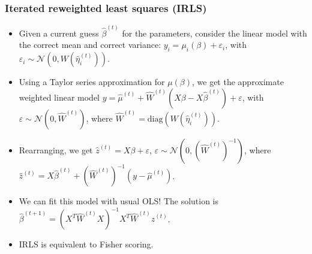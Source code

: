 \documentclass[twoside]{article}
\newcommand\calN{\mathcal{N}}
\def\eps{\varepsilon}
\begin{document}
\subsubsection*{Iterated reweighted least squares (IRLS)}
\begin{itemize}
\item Given a current guess $\hat{\beta}^{(t)}$ for the parameters, consider the linear model with the correct mean and correct variance: $y_i = \mu_i(\beta) + \eps_i$, with $\eps_i \sim \calN(0, W(\hat{\eta}_i^{(t)}))$.

\item Using a Taylor series approximation for $\mu(\beta)$, we get the approximate weighted linear model $y = \hat{\mu}^{(t)} + \hat{W}^{(t)}(X \beta - X\hat{\beta}^{(t)}) + \eps$, with $\eps \sim \calN(0, \hat{W}^{(t)})$, where $\hat{W}^{(t)} = \text{diag}(W(\hat{\eta}_i^{(t)}))$.

\item Rearranging, we get $\hat{z}^{(t)} = X\beta + \eps$, $\eps \sim \calN(0, (\hat{W}^{(t)})^{-1})$, where $\hat{z}^{(t)} = X \hat{\beta}^{(t)} + (\hat{W}^{(t)})^{-1} (y - \hat{\mu}^{(t)})$.

\item We can fit this model with usual OLS! The solution is $\hat{\beta}^{(t+1)} = (X^T \hat{W}^{(t)} X)^{-1} X^T \hat{W}^{(t)} \hat{z}^{(t)}$.

\item IRLS is equivalent to Fisher scoring.
\end{itemize}
\end{document}
